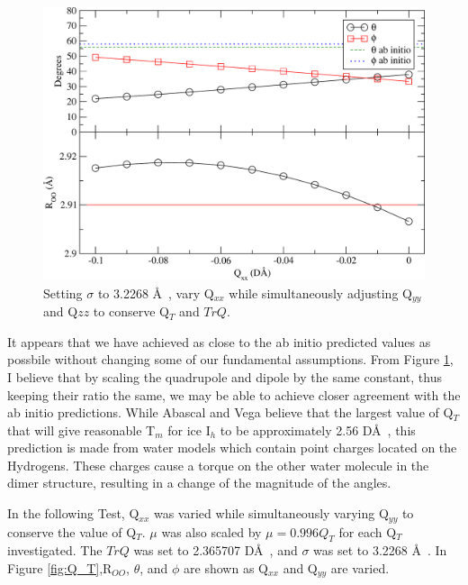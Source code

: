\begin{figure}[h!]
\includegraphics[width = \linewidth]{Figures/Test7_plot.pdf}
\caption{\label{fig:Qxx5} Setting $\sigma$ to 3.2268 \AA~, vary Q$_{xx}$ while simultaneously adjusting Q$_{yy}$ and Q${zz}$ to conserve Q$_T$ and $TrQ$.}
\end{figure}

It appears that we have achieved as close to the ab initio predicted values
as possbile without changing some of our fundamental assumptions. From Figure
\ref{fig:Qxx5}, I believe that by scaling the quadrupole and dipole by 
the same constant, thus keeping their ratio the same, we may be able to achieve
closer agreement with the ab initio predictions. While Abascal and Vega believe
that the largest value of Q$_T$ that will give reasonable T$_m$ for ice I$_h$
to be approximately 2.56 D\AA~, this prediction is made from water models which
contain point charges located on the Hydrogens. These charges cause a torque
on the other water molecule in the dimer structure, resulting in a change of
the magnitude of the angles.

In the following Test, Q$_{xx}$ was varied while simultaneously varying
Q$_{yy}$ to conserve the value of Q$_T$. 
$\mu$ was also scaled by $\mu = 0.996 Q_T$ for each Q$_T$ investigated. 
The $TrQ$ was set to 2.365707 D\AA~, and $\sigma$
was set to 3.2268 \AA~. In Figure \ref{fig:Q_T},R$_{OO}$, $\theta$, and 
$\phi$ are shown as Q$_{xx}$ and Q$_{yy}$ are varied.

